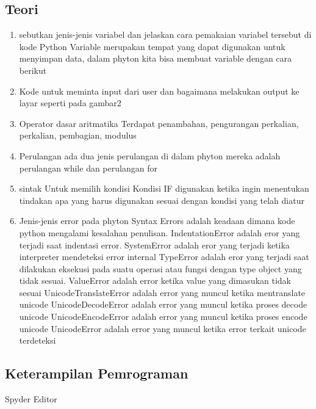 \subsection{Teori}
\begin{enumerate}

\item sebutkan jenis-jenis variabel dan jelaskan cara pemakaian variabel tersebut di kode Python
Variable merupakan tempat yang dapat digunakan untuk menyimpan data, dalam phyton kita bisa membuat variable dengan cara berikut

\item Kode untuk meminta input dari user dan bagaimana melakukan output ke layar seperti pada gambar2

\item Operator dasar aritmatika
Terdapat penambahan, pengurangan perkalian, perkalian, pembagian, modulus

\item Perulangan
ada dua jenis perulangan di dalam phyton mereka adalah perulangan while dan perulangan for

\item sintak Untuk memilih kondisi
Kondisi IF digunakan ketika ingin menentukan tindakan apa yang harus digunakan sesuai dengan kondisi yang telah diatur

\item Jenis-jenis error pada phyton
Syntax Errors adalah keadaan dimana kode python mengalami kesalahan penulisan. 
IndentationError adalah eror yang terjadi saat indentasi error.
SystemError adalah eror yang terjadi ketika interpreter mendeteksi error internal
TypeError adalah eror yang terjadi saat dilakukan eksekusi pada suatu operasi atau fungsi dengan type object yang tidak sesuai.
ValueError adalah error ketika value yang dimasukan tidak sesuai
UnicodeTranslateError adalah error yang muncul ketika mentranslate unicode
UnicodeDecodeError adalah error yang muncul ketika  proses decode unicode
UnicodeEncodeError adalah error yang muncul ketika  proses encode unicode
UnicodeError adalah error yang muncul ketika error terkait unicode terdeteksi

\end{enumerate}

\subsection{Keterampilan Pemrograman}

    Spyder Editor

